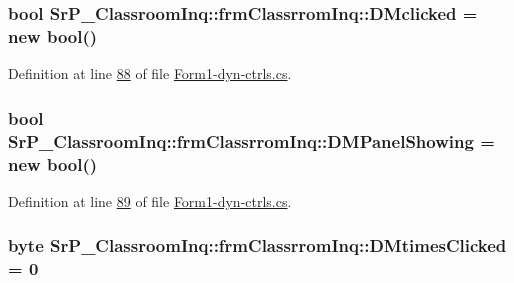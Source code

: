 \hypertarget{class_sr_p___classroom_inq_1_1frm_classrrom_inq_a663c3385393ae39a41bd647632ba4617}{
\subsubsection[{\-D\-Mclicked}]{\setlength{\rightskip}{0pt plus 5cm}bool {\bf \-Sr\-P\-\_\-\-Classroom\-Inq\-::frm\-Classrrom\-Inq\-::\-D\-Mclicked} = new bool()}}
\label{class_sr_p___classroom_inq_1_1frm_classrrom_inq_a663c3385393ae39a41bd647632ba4617}


\-Definition at line \hyperlink{_form1-dyn-ctrls_8cs_source_l00088}{88} of file \hyperlink{_form1-dyn-ctrls_8cs_source}{\-Form1-\/dyn-\/ctrls.\-cs}.

\hypertarget{class_sr_p___classroom_inq_1_1frm_classrrom_inq_a7a4d3ad70d4284ad3f7d8ab3ca8718e0}{
\subsubsection[{\-D\-M\-Panel\-Showing}]{\setlength{\rightskip}{0pt plus 5cm}bool {\bf \-Sr\-P\-\_\-\-Classroom\-Inq\-::frm\-Classrrom\-Inq\-::\-D\-M\-Panel\-Showing} = new bool()}}
\label{class_sr_p___classroom_inq_1_1frm_classrrom_inq_a7a4d3ad70d4284ad3f7d8ab3ca8718e0}


\-Definition at line \hyperlink{_form1-dyn-ctrls_8cs_source_l00089}{89} of file \hyperlink{_form1-dyn-ctrls_8cs_source}{\-Form1-\/dyn-\/ctrls.\-cs}.

\hypertarget{class_sr_p___classroom_inq_1_1frm_classrrom_inq_a595a5c6942aa919d47de2b3e20f5f5bc}{
\subsubsection[{\-D\-Mtimes\-Clicked}]{\setlength{\rightskip}{0pt plus 5cm}byte {\bf \-Sr\-P\-\_\-\-Classroom\-Inq\-::frm\-Classrrom\-Inq\-::\-D\-Mtimes\-Clicked} = 0}}
\label{class_sr_p___classroom_inq_1_1frm_classrrom_inq_a595a5c6942aa919d47de2b3e20f5f5bc}


